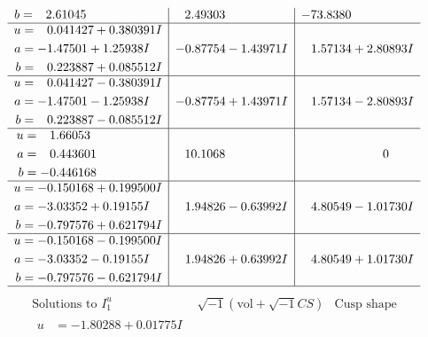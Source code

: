 \documentclass[1p]{elsarticle_modified}
\theoremstyle{definition}
\newcommand{\I}{\sqrt{-1}}
\begin{document}
$$\begin{array}{c|c|c}
\begin{aligned}
b &= \phantom{-}2.61045\phantom{ +0.000000I}\end{aligned}
 & \phantom{-}2.49303\phantom{ +0.000000I} & -73.8380\phantom{ +0.000000I} \\ \hline\begin{aligned}
u &= \phantom{-}0.041427 + 0.380391 I \\
a &= -1.47501 + 1.25938 I \\
b &= \phantom{-}0.223887 + 0.085512 I\end{aligned}
 & -0.87754 - 1.43971 I & \phantom{-}1.57134 + 2.80893 I \\ \hline\begin{aligned}
u &= \phantom{-}0.041427 - 0.380391 I \\
a &= -1.47501 - 1.25938 I \\
b &= \phantom{-}0.223887 - 0.085512 I\end{aligned}
 & -0.87754 + 1.43971 I & \phantom{-}1.57134 - 2.80893 I \\ \hline\begin{aligned}
u &= \phantom{-}1.66053\phantom{ +0.000000I} \\
a &= \phantom{-}0.443601\phantom{ +0.000000I} \\
b &= -0.446168\phantom{ +0.000000I}\end{aligned}
 & \phantom{-}10.1068\phantom{ +0.000000I} & \phantom{-0.000000 } 0 \\ \hline\begin{aligned}
u &= -0.150168 + 0.199500 I \\
a &= -3.03352 + 0.19155 I \\
b &= -0.797576 + 0.621794 I\end{aligned}
 & \phantom{-}1.94826 - 0.63992 I & \phantom{-}4.80549 - 1.01730 I \\ \hline\begin{aligned}
u &= -0.150168 - 0.199500 I \\
a &= -3.03352 - 0.19155 I \\
b &= -0.797576 - 0.621794 I\end{aligned}
 & \phantom{-}1.94826 + 0.63992 I & \phantom{-}4.80549 + 1.01730 I\\
 \hline 
 \end{array}$$\newpage$$\begin{array}{c|c|c}  
\text{Solutions to }I^u_{1}& \I (\text{vol} + \sqrt{-1}CS) & \text{Cusp shape}\\
 \hline 
\begin{aligned}
u &= -1.80288 + 0.01775 I \\

\end{aligned}
\end{array}$$
\end{document}
